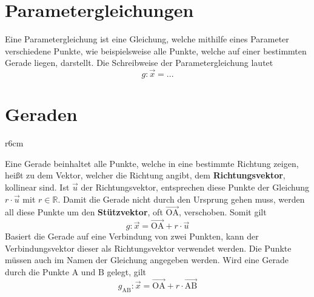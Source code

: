 \documentclass{article}
\begin{document}
 
\newcommand{\vect}[1]{\overrightarrow{#1}}
  
\section{Parametergleichungen}
Eine Parametergleichung ist eine Gleichung, welche mithilfe eines Parameter verschiedene Punkte, wie beispielsweise alle Punkte, welche auf einer bestimmten Gerade liegen, darstellt. \newline
Die Schreibweise der Parametergleichung lautet 
\[
 g: \vect{x} = ...
\] 
  
\section{Geraden} 
\begin{wrapfigure}{r}{6cm}
  \centering
\end{wrapfigure} 
Eine Gerade beinhaltet alle Punkte, welche in eine bestimmte Richtung zeigen, heißt zu dem Vektor, welcher die Richtung angibt, dem \textbf{Richtungsvektor}, kollinear sind. Ist $\vect{u}$ der Richtungsvektor, entsprechen diese Punkte der Gleichung $r \cdot \vect{u}$ mit $r \in \mathbb{R}$. Damit die Gerade nicht durch den Ursprung gehen muss, werden all diese Punkte um den \textbf{Stützvektor}, oft $\vect{\mathrm{OA}}$, verschoben.
Somit gilt 
\[
 g: \vect{x} = \vect{\mathrm{OA}} + r \cdot \vect{u} 
\] 
Basiert die Gerade auf eine Verbindung von zwei Punkten, kann der Verbindungsvektor dieser als Richtungsvektor verwendet werden. Die Punkte müssen auch im Namen der Gleichung angegeben werden. Wird eine Gerade durch die Punkte $\mathrm{A}$ und $\mathrm{B}$ gelegt, gilt 
\[
 g_{\mathrm{AB}}: \vect{x} = \vect{\mathrm{OA}} + r \cdot \vect{\mathrm{AB}} 
\]
 
\end{document}

